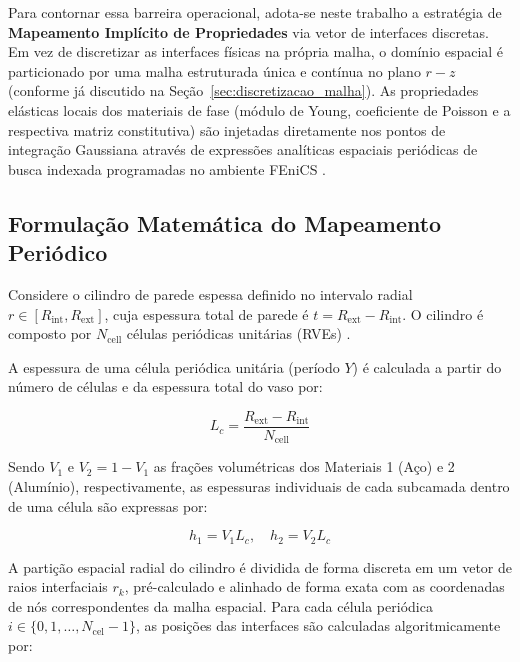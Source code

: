 Para contornar essa barreira operacional, adota-se neste trabalho a estratégia de \textbf{Mapeamento Implícito de Propriedades} via vetor de interfaces discretas. Em vez de discretizar as interfaces físicas na própria malha, o domínio espacial é particionado por uma malha estruturada única e contínua no plano $r-z$ (conforme já discutido na Seção~\ref{sec:discretizacao_malha}). As propriedades elásticas locais dos materiais de fase (módulo de Young, coeficiente de Poisson e a respectiva matriz constitutiva) são injetadas diretamente nos pontos de integração Gaussiana através de expressões analíticas espaciais periódicas de busca indexada programadas no ambiente FEniCS \cite{logg2012automated}.


\subsection{Formulação Matemática do Mapeamento Periódico}


Considere o cilindro de parede espessa definido no intervalo radial $r \in [R_{\text{int}}, R_{\text{ext}}]$, cuja espessura total de parede é $t = R_{\text{ext}} - R_{\text{int}}$. O cilindro é composto por $N_{\text{cell}}$ células periódicas unitárias (RVEs) \cite{bakhvalov1989}.

A espessura de uma célula periódica unitária (período $Y$) é calculada a partir do número de células e da espessura total do vaso por:

\begin{equation}
  L_c = \frac{R_{\text{ext}} - R_{\text{int}}}{N_{\text{cell}}}
  \label{eq:L_c}
\end{equation}

Sendo $V_1$ e $V_2 = 1 - V_1$ as frações volumétricas dos Materiais 1 (Aço) e 2 (Alumínio), respectivamente, as espessuras individuais de cada subcamada dentro de uma célula são expressas por:

\begin{equation}
  h_1 = V_1 L_c , \quad h_2 = V_2 L_c
  \label{eq:h_camadas}
\end{equation}

A partição espacial radial do cilindro é dividida de forma discreta em um vetor de raios interfaciais $r_k$, pré-calculado e alinhado de forma exata com as coordenadas de nós correspondentes da malha espacial. Para cada célula periódica $i \in \{0, 1, \dots, N_{\text{cel}} - 1\}$, as posições das interfaces são calculadas algoritmicamente por:

